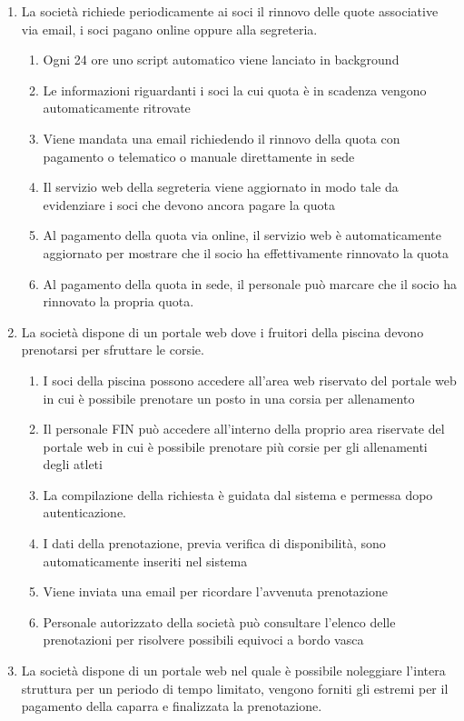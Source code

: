 \documentclass[11pt]{article} %
\begin{document}
\begin{enumerate}
	\item La società richiede periodicamente ai soci il rinnovo delle quote associative via email, i soci pagano online oppure alla segreteria.
	\begin{enumerate}
		\item Ogni 24 ore uno script automatico viene lanciato in background
		\item Le informazioni riguardanti i soci la cui quota è in scadenza vengono automaticamente ritrovate
		\item Viene mandata una email richiedendo il rinnovo della quota con pagamento o telematico o manuale direttamente in sede
		\item Il servizio web della segreteria viene aggiornato in modo tale da evidenziare i soci che devono ancora pagare la quota
		\item Al pagamento della quota via online, il servizio web è automaticamente aggiornato per mostrare che il socio ha effettivamente rinnovato la quota
		\item Al pagamento della quota in sede, il personale può marcare che il socio ha rinnovato la propria quota.
	\end{enumerate}
	\item La società dispone di un portale web dove i fruitori della piscina devono prenotarsi per sfruttare le corsie.
	\begin{enumerate}
		\item I soci della piscina possono accedere all'area web riservato del portale web in cui è possibile prenotare un posto in una corsia per allenamento
		\item Il personale FIN può accedere all'interno della proprio area riservate del portale web in cui è possibile prenotare più corsie per gli allenamenti degli atleti
		\item La compilazione della richiesta è guidata dal sistema e permessa dopo autenticazione.
		\item I dati della prenotazione, previa verifica di disponibilità, sono automaticamente inseriti nel sistema
		\item Viene inviata una email per ricordare l'avvenuta prenotazione
		\item Personale autorizzato della società può consultare l'elenco delle prenotazioni per risolvere possibili equivoci a bordo vasca
	\end{enumerate}
	\item La società dispone di un portale web nel quale è possibile noleggiare l'intera struttura per un periodo di tempo limitato, vengono forniti gli estremi per il pagamento della caparra e finalizzata la prenotazione.

\end{enumerate}
\end{document}
